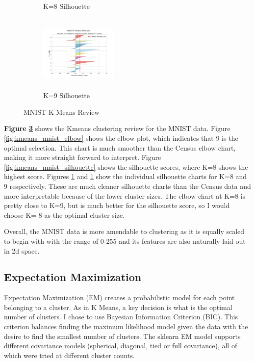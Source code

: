 \documentclass[letterpaper]{article} %
\begin{document}
\begin{figure}[!htb]
\begin{subfigure} [b]{.25\textwidth}
			\caption{K=8 Silhouette}
			\label{fig:kmeans_mnist_silhouette_8}
		\end{subfigure}%
		\begin{subfigure} [b]{.25\textwidth}
			\centering
			\includegraphics[width=1.5in, height=1.5in]{figures/MNIST_silhouette_K_9.png}
			\caption{K=9 Silhouette}
			\label{fig:kmeans_mnist_silhouette_9}
		\end{subfigure}	
		\caption{MNIST K Means Review}
		\label{fig:kmeans_mnist_cluster}
\end{figure}

\textbf{Figure \ref{fig:kmeans_mnist_cluster}} shows the Kmeans clustering review for the MNIST data.  Figure \ref{fig:kmeans_mnist_elbow} shows the elbow plot, which indicates that 9 is the optimal selection.  This chart is much smoother than the Census elbow chart, making it more straight forward to interpret.  Figure \ref{fig:kmeans_mnist_silhouette} shows the silhouette scores, where K=8 shows the highest score.  Figures  \ref{fig:kmeans_mnist_silhouette_8}  and \ref{fig:kmeans_mnist_silhouette_8} show the individual silhouette charts for K=8 and 9 respectively.  These are much cleaner silhouette charts than the Census data and more interpretable because of the lower cluster sizes.  The elbow chart at K=8 is pretty close to K=9, but is much better for the silhouette score, so I would choose K= 8 as the optimal cluster size.

Overall, the MNIST data is more amendable to clustering as it is equally scaled to begin with with the range of 0-255 and its features are also naturally laid out in 2d space.  

\subsection{Expectation Maximization}
Expectation Maximization (EM) creates a probabilistic model for each point belonging to a cluster.  As in K Means, a key decision is what is the optimal number of clusters.  I chose to use Bayesian Information Criterion (BIC).  This criterion balances finding the maximum likelihood model given the data with the desire to find the smallest number of clusters.  The sklearn EM model supports different covariance models (spherical, diagonal, tied or full covariance), all of which were tried at different cluster counts.
\end{document}
